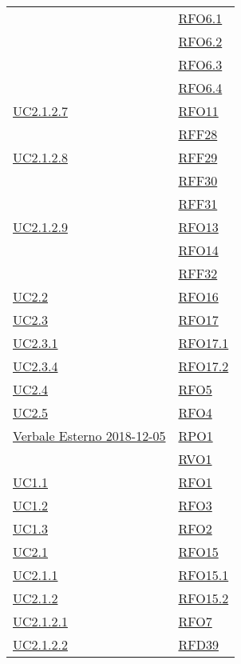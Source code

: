 \begin{longtable}{|>{\centering}m{5cm}|m{5cm}<{\centering}|}
	& \hyperlink{RFO6.1}{RFO6.1}\\
	& \hyperlink{RFO6.2}{RFO6.2}\\
	& \hyperlink{RFO6.3}{RFO6.3}\\
	& \hyperlink{RFO6.4}{RFO6.4}\\ \hline
	\hyperlink{UC2.1.2.7}{UC2.1.2.7} & \hyperlink{RFO11}{RFO11}\\
	& \hyperlink{RFF28}{RFF28}\\ \hline
	\hyperlink{UC2.1.2.8}{UC2.1.2.8} & \hyperlink{RFF29}{RFF29}\\
	& \hyperlink{RFF30}{RFF30}\\
	& \hyperlink{RFF31}{RFF31}\\ \hline
	\hyperlink{UC2.1.2.9}{UC2.1.2.9} & \hyperlink{RFO13}{RFO13}\\
	& \hyperlink{RFO14}{RFO14}\\
	& \hyperlink{RFF32}{RFF32}\\ \hline
	\hyperlink{UC2.2}{UC2.2} & \hyperlink{RFO16}{RFO16}\\ \hline
	\hyperlink{UC2.3}{UC2.3} & \hyperlink{RFO17}{RFO17}\\ \hline
	\hyperlink{UC2.3.1}{UC2.3.1} & \hyperlink{RFO17.1}{RFO17.1}\\ \hline
	\hyperlink{UC2.3.4}{UC2.3.4} & \hyperlink{RFO17.2}{RFO17.2}\\ \hline
	\hyperlink{UC2.4}{UC2.4} & \hyperlink{RFO5}{RFO5}\\ \hline
	\hyperlink{UC2.5}{UC2.5} & \hyperlink{RFO4}{RFO4}\\ \hline
	\hyperlink{Verbale Esterno 2018-12-05}{Verbale Esterno 2018-12-05} & \hyperlink{RPO1}{RPO1}\\
	& \hyperlink{RVO1}{RVO1}\\ \hline
	\hyperref[UC1.1]{UC1.1} & \hyperlink{RFO1}{RFO1}\\ \hline
	\hyperref[UC1.2]{UC1.2} & \hyperlink{RFO3}{RFO3}\\ \hline
	\hyperref[UC1.3]{UC1.3} & \hyperlink{RFO2}{RFO2}\\ \hline
	\hyperref[UC2.1]{UC2.1} & \hyperlink{RFO15}{RFO15}\\ \hline
	\hyperref[UC2.1.1]{UC2.1.1} & \hyperlink{RFO15.1}{RFO15.1}\\ \hline
	\hyperref[UC2.1.2]{UC2.1.2} & \hyperlink{RFO15.2}{RFO15.2}\\ \hline
	\hyperref[UC2.1.2.1]{UC2.1.2.1} & \hyperlink{RFO7}{RFO7}\\ \hline
	\hyperref[UC2.1.2.2]{UC2.1.2.2} & \hyperlink{RFD39}{RFD39}\\ \hline

\end{longtable}
